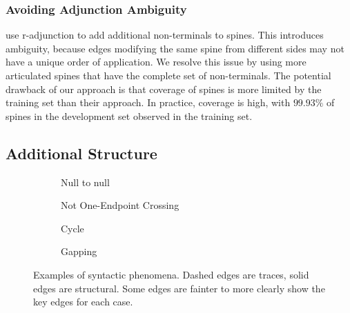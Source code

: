 \subsubsection{Avoiding Adjunction Ambiguity}

\textcite{cck} use r-adjunction to add additional non-terminals to spines.
This introduces ambiguity, because edges modifying the same spine from different sides may not have a unique order of application.
We resolve this issue by using more articulated spines that have the complete set of non-terminals.
The potential drawback of our approach is that coverage of spines is more limited by the training set than their approach.
In practice, coverage is high, with $99.93\%$ of spines in the development set observed in the training set.

\subsection{Additional Structure} \label{sec:rep-other}

\begin{figure}
\hfill
\begin{subfigure}[b]{0.39\textwidth}
  \centering
  \scalebox{0.8}{}
  \caption{\label{fig:null-null}
    Null to null
  }
\end{subfigure}
\hfill
\begin{subfigure}[b]{0.5\textwidth}
  \centering
  \scalebox{0.8}{}
  \caption{\label{fig:not-1ec}
    Not One-Endpoint Crossing
  }
\end{subfigure}
\hfill
\strut

\vspace{5mm}
\hfill
\begin{subfigure}[b]{0.33\textwidth}
  \centering
  \scalebox{0.8}{}
  \caption{\label{fig:cycle}
    Cycle
  }
\end{subfigure}
\hfill
\begin{subfigure}[b]{0.46\textwidth}
  \centering
  \scalebox{0.8}{}
  \caption{\label{fig:gapping}
    Gapping
  }
\end{subfigure}
\hfill
\strut
\caption[Examples of graph structured syntactic phenomena.]{
Examples of syntactic phenomena.
Dashed edges are traces, solid edges are structural.
Some edges are fainter to more clearly show the key edges for each case.
}
\end{figure}

